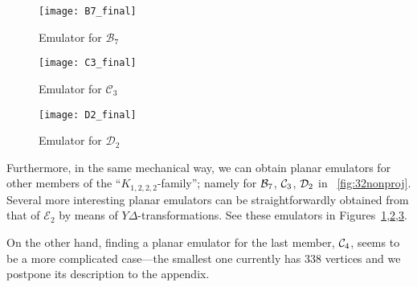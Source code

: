 \documentclass[envcountsect,envcountsame]{llncs}
\renewenvironment{accumulate}{}{}
\newenvironment{onlynoaccum}{}{}
\def\ca#1{{\cal #1}}
\newcommand{\KKK}{\ensuremath{K_{1,2,2,2}}\xspace}
\newcommand{\EE}{\ensuremath{\mathcal{E}_2}\xspace}
\begin{document}
\begin{figure}[htb]
\centering
\texttt{[image: B7\_final]}
\caption{Emulator for \ensuremath{\mathcal{B}_7} }
\label{fig:B7_final}
\end{figure}
\begin{figure}[htb]
\centering
\texttt{[image: C3\_final]}
\caption{Emulator for \ensuremath{\mathcal{C}_3}}
\label{fig:C3_final}
\end{figure}
\begin{figure}[htb]
\centering
\texttt{[image: D2\_final]}
\caption{Emulator for \ensuremath{\mathcal{D}_2}}
\label{fig:D2_final}
\end{figure}

Furthermore, in the same mechanical way, we can obtain planar emulators for
other members of the ``\KKK-family''; namely for $\ca B_7$, $\ca C_3$, $\ca D_2$
in \figurename~\ref{fig:32nonproj}.
\begin{accumulate}
Several more interesting planar emulators can be straightforwardly 
obtained from that of \EE by means of ${Y\!\Delta}$-transformations.
See these emulators in
Figures~\ref{fig:B7_final},\ref{fig:C3_final},\ref{fig:D2_final}.

\end{accumulate}
\begin{onlynoaccum}
On the other hand, finding a planar emulator
for the last member, $\ca C_4$, seems to be a more complicated case---the
smallest one currently has $338$ vertices and we
postpone its description to the appendix.
\end{onlynoaccum}
\end{document}
